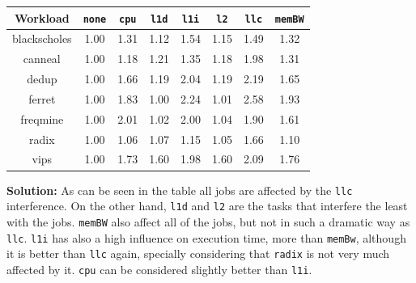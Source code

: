 \begin{enumerate}
\begin{enumerate}
        \begin{center}
        \begin{tabular}{ |c|c|c|c|c|c|c|c| } 
        \hline
         \textbf{Workload} & \texttt{\textbf{none}} & \texttt{\textbf{cpu}} & \texttt{\textbf{l1d}} & \texttt{\textbf{l1i}} & \texttt{\textbf{l2}} & \texttt{\textbf{llc}} & \texttt{\textbf{memBW}}  \\
         \hline\hline
        blackscholes & 1.00 & \cellcolor{YellowOrange!75}1.31 & \cellcolor{Green!75}1.12 & \cellcolor{YellowOrange!75}1.54 & \cellcolor{Green!75}1.15 & \cellcolor{YellowOrange!75}1.49 & \cellcolor{YellowOrange!75}1.32 \\  \hline
        canneal & 1.00 & \cellcolor{Green!75}1.18 & \cellcolor{Green!75}1.21 & \cellcolor{YellowOrange!75}1.35 & \cellcolor{Green!75}1.18 & \cellcolor{YellowOrange!75}1.98 & \cellcolor{YellowOrange!75}1.31 \\  \hline
        dedup & 1.00 & \cellcolor{YellowOrange!75}1.66 & \cellcolor{Green!75}1.19 & \cellcolor{Red!75}2.04 & \cellcolor{Green!75}1.19 & \cellcolor{Red!75}2.19 & \cellcolor{YellowOrange!75}1.65 \\  \hline
        ferret & 1.00 & \cellcolor{YellowOrange!75}1.83 & \cellcolor{Green!75}1.00 & \cellcolor{Red!75}2.24 & \cellcolor{Green!75}1.01 & \cellcolor{Red!75}2.58 & \cellcolor{YellowOrange!75}1.93 \\  \hline
        freqmine & 1.00 & \cellcolor{Red!75}2.01 & \cellcolor{Green!75}1.02 & \cellcolor{Red!75}2.00 & \cellcolor{Green!75}1.04 & \cellcolor{YellowOrange!75}1.90 & \cellcolor{YellowOrange!75}1.61 \\  \hline
        radix & 1.00 & \cellcolor{Green!75}1.06 & \cellcolor{Green!75}1.07 & \cellcolor{Green!75}1.15 & \cellcolor{Green!75}1.05 & \cellcolor{YellowOrange!75}1.66 & \cellcolor{Green!75}1.10 \\  \hline
        vips & 1.00 & \cellcolor{YellowOrange!75}1.73 & \cellcolor{YellowOrange!75}1.60 & \cellcolor{YellowOrange!75}1.98 & \cellcolor{YellowOrange!75}1.60 & \cellcolor{Red!75}2.09 & \cellcolor{YellowOrange!75}1.76 \\  \hline
        \end{tabular}
        \end{center}
        

         \textbf{Solution:} As can be seen in the table all jobs are affected by the \texttt{llc} interference. On the other hand,  \texttt{l1d} and \texttt{l2} are the tasks that interfere the least with the jobs. \texttt{memBW} also affect all of the jobs, but not in such a dramatic way as \texttt{llc}. \texttt{l1i} has also a high influence on execution time, more than \texttt{memBw}, although it is better than \texttt{llc} again, specially considering that \texttt{radix} is not very much affected by it. \texttt{cpu} can be considered slightly better than \texttt{l1i}.


\end{enumerate}
\end{enumerate}
